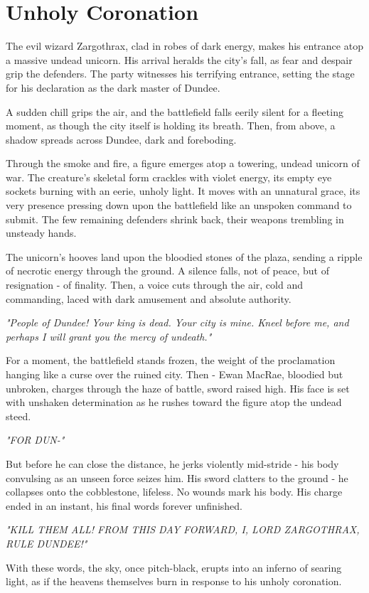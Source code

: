 \section*{Unholy Coronation}
{\entryfont The evil wizard Zargothrax, clad in robes of dark energy, makes his entrance atop a massive undead unicorn. His arrival heralds the city's fall, as fear and despair grip the defenders. The party witnesses his terrifying entrance, setting the stage for his declaration as the dark master of Dundee.}
\begin{DndReadAloud}
	A sudden chill grips the air, and the battlefield falls eerily silent for a fleeting moment, as though the city itself is holding its breath. Then, from above, a shadow spreads across Dundee, dark and foreboding.
	
	Through the smoke and fire, a figure emerges atop a towering, undead unicorn of war. The creature's skeletal form crackles with violet energy, its empty eye sockets burning with an eerie, unholy light. It moves with an unnatural grace, its very presence pressing down upon the battlefield like an unspoken command to submit. The few remaining defenders shrink back, their weapons trembling in unsteady hands.

	The unicorn's hooves land upon the bloodied stones of the plaza, sending a ripple of necrotic energy through the ground. A silence falls, not of peace, but of resignation - of finality. Then, a voice cuts through the air, cold and commanding, laced with dark amusement and absolute authority.

	\textit{"People of Dundee! Your king is dead. Your city is mine. Kneel before me, and perhaps I will grant you the mercy of undeath."}
	
	For a moment, the battlefield stands frozen, the weight of the proclamation hanging like a curse over the ruined city. Then - Ewan MacRae, bloodied but unbroken, charges through the haze of battle, sword raised high. His face is set with unshaken determination as he rushes toward the figure atop the undead steed.
	
	\textit{"FOR DUN-"}
	
	But before he can close the distance, he jerks violently mid-stride - his body convulsing as an unseen force seizes him. His sword clatters to the ground - he collapses onto the cobblestone, lifeless. No wounds mark his body. His charge ended in an instant, his final words forever unfinished.
	
	\textit{"KILL THEM ALL! FROM THIS DAY FORWARD, I, LORD ZARGOTHRAX, RULE DUNDEE!"}
	
	With these words, the sky, once pitch-black, erupts into an inferno of searing light, as if the heavens themselves burn in response to his unholy coronation.
\end{DndReadAloud}

